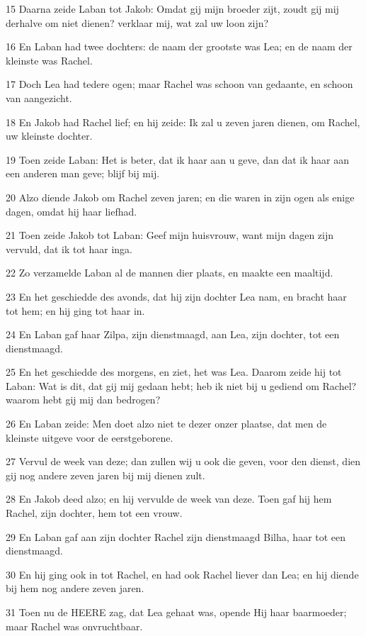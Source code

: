 \par 15 Daarna zeide Laban tot Jakob: Omdat gij mijn broeder zijt, zoudt gij mij derhalve om niet dienen? verklaar mij, wat zal uw loon zijn?
\par 16 En Laban had twee dochters: de naam der grootste was Lea; en de naam der kleinste was Rachel.
\par 17 Doch Lea had tedere ogen; maar Rachel was schoon van gedaante, en schoon van aangezicht.
\par 18 En Jakob had Rachel lief; en hij zeide: Ik zal u zeven jaren dienen, om Rachel, uw kleinste dochter.
\par 19 Toen zeide Laban: Het is beter, dat ik haar aan u geve, dan dat ik haar aan een anderen man geve; blijf bij mij.
\par 20 Alzo diende Jakob om Rachel zeven jaren; en die waren in zijn ogen als enige dagen, omdat hij haar liefhad.
\par 21 Toen zeide Jakob tot Laban: Geef mijn huisvrouw, want mijn dagen zijn vervuld, dat ik tot haar inga.
\par 22 Zo verzamelde Laban al de mannen dier plaats, en maakte een maaltijd.
\par 23 En het geschiedde des avonds, dat hij zijn dochter Lea nam, en bracht haar tot hem; en hij ging tot haar in.
\par 24 En Laban gaf haar Zilpa, zijn dienstmaagd, aan Lea, zijn dochter, tot een dienstmaagd.
\par 25 En het geschiedde des morgens, en ziet, het was Lea. Daarom zeide hij tot Laban: Wat is dit, dat gij mij gedaan hebt; heb ik niet bij u gediend om Rachel? waarom hebt gij mij dan bedrogen?
\par 26 En Laban zeide: Men doet alzo niet te dezer onzer plaatse, dat men de kleinste uitgeve voor de eerstgeborene.
\par 27 Vervul de week van deze; dan zullen wij u ook die geven, voor den dienst, dien gij nog andere zeven jaren bij mij dienen zult.
\par 28 En Jakob deed alzo; en hij vervulde de week van deze. Toen gaf hij hem Rachel, zijn dochter, hem tot een vrouw.
\par 29 En Laban gaf aan zijn dochter Rachel zijn dienstmaagd Bilha, haar tot een dienstmaagd.
\par 30 En hij ging ook in tot Rachel, en had ook Rachel liever dan Lea; en hij diende bij hem nog andere zeven jaren.
\par 31 Toen nu de HEERE zag, dat Lea gehaat was, opende Hij haar baarmoeder; maar Rachel was onvruchtbaar.
